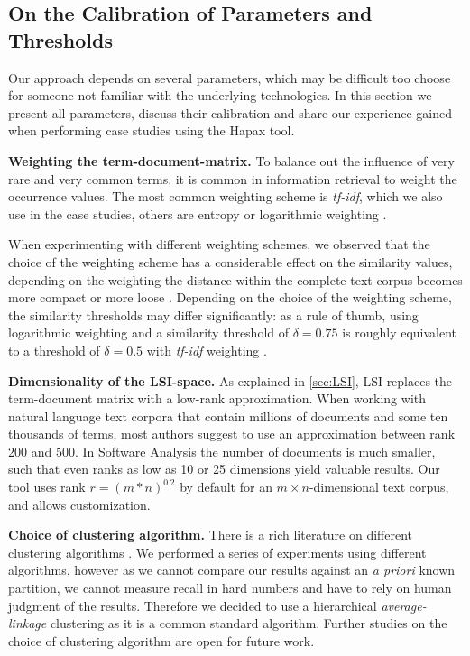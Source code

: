 \documentclass[10pt]{book}
\begin{document}
\subsection{On the Calibration of Parameters and Thresholds}\label{sec:parameters}

Our approach depends on several parameters, which may be difficult too choose for someone not familiar with the underlying technologies. In this section we present all parameters, discuss their calibration and share our experience gained when performing case studies using the Hapax tool.

  \textbf{Weighting the term-document-matrix.} To balance out the influence of very rare and very common terms, it is common in information retrieval to weight the occurrence values. The most common weighting scheme is \emph{tf-idf}, which we also use in the case studies, others are entropy or logarithmic weighting \cite{Duma91a}.

  When experimenting with different weighting schemes, we observed that the choice of the weighting scheme has a considerable effect on the similarity values, depending on the weighting the distance within the complete text corpus becomes more compact or more loose \cite{Nako01b}. Depending on the choice of the weighting scheme, the similarity thresholds may differ significantly: as a rule of thumb, using logarithmic weighting and a similarity threshold of $\delta = 0.75$ is roughly equivalent to a threshold of $\delta = 0.5$ with \emph{tf-idf} weighting \cite{Nako01a}.

  \textbf{Dimensionality of the LSI-space.} As explained in \autoref{sec:LSI}, LSI replaces the term-document matrix with a low-rank approximation. When working with natural language text corpora that contain millions of documents and some ten thousands of terms, most authors suggest to use an approximation between rank 200 and 500. In Software Analysis the number of documents is much smaller, such that even ranks as low as 10 or 25 dimensions yield valuable results. Our tool uses rank $r = (m * n)^{0.2}$ by default for an $m \times n$-dimensional text corpus, and allows customization.

  \textbf{Choice of clustering algorithm.} There is a rich literature on different clustering algorithms \cite{Jain99a}. We performed a series of experiments using different algorithms, however as we cannot compare our results against an \emph{a priori} known partition, we cannot measure recall in hard numbers and have to rely on human judgment of the results. Therefore we decided to use a hierarchical \emph{average-linkage} clustering as it is a common standard algorithm. Further studies on the choice of clustering algorithm are open for future work.
\end{document}
